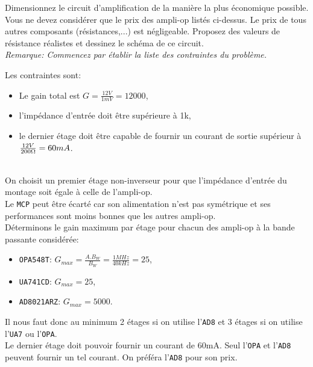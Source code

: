 \documentclass{../template/tp}
\begin{document}
\Question
{
    Dimensionnez le circuit d'amplification de la manière la plus économique possible. 
    Vous ne devez considérer que le prix des ampli-op listés ci-dessus.
    Le prix de tous autres composants (résistances,...) est négligeable. 
    Proposez des valeurs de résistance réalistes et dessinez le schéma de ce circuit.\\
    \textit{Remarque: Commencez par établir la liste des contraintes du problème.}
}
{
    Les contraintes sont:
    \begin{itemize}
        \item Le gain total est $ G = \frac{\si{12}{V}}{\si{1}{mV}} = 12000 $,
        \item l'impédance d'entrée doit être supérieure à \si{1}{k\ohm},
        \item le dernier étage doit être capable de fournir un courant de sortie supérieur à 
            $ \frac{ \si{12}{V} }{ \si{200}{\ohm} } = \si{60}{mA} $.
    \end{itemize}
    ~\\

    On choisit un premier étage non-inverseur pour que l'impédance d'entrée du montage soit égale à celle de l'ampli-op.
    ~\\

    Le \texttt{MCP} peut être écarté car son alimentation n'est pas symétrique et ses performances sont moins bonnes que les autres ampli-op.
    ~\\
    
    Déterminons le gain maximum par étage pour chacun des ampli-op à la bande passante considérée:
    \begin{itemize}
        \item \texttt{OPA548T}: $ G_{max} = \frac{A.B_{W}}{B_{W}} =
            \frac{\si{1}{MHz}}{\si{40}{kHz}} = 25 $,
        \item \texttt{UA741CD}: $ G_{max} = 25 $,
        \item \texttt{AD8021ARZ}: $ G_{max} = 5000 $.
    \end{itemize}
    Il nous faut donc au minimum 2 étages si on utilise l'\texttt{AD8} et 3 étages si on utilise l'\texttt{UA7} ou l'\texttt{OPA}.
    ~\\
    
    Le dernier étage doit pouvoir fournir un courant de \si{60}{mA}.
    Seul l'\texttt{OPA} et l'\texttt{AD8} peuvent fournir un tel courant.
    On préféra l'\texttt{AD8} pour son prix.
    ~\\
    
}
\end{document}
